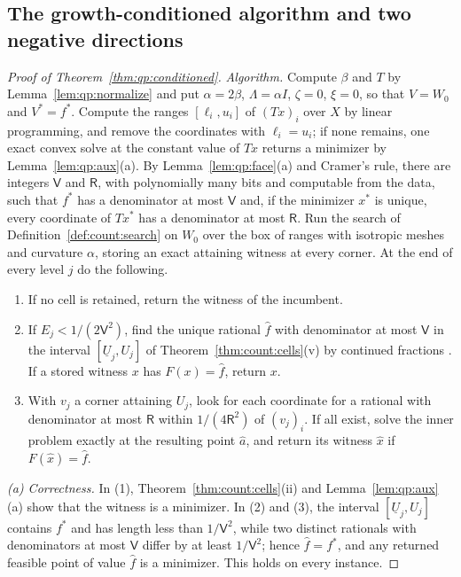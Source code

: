 \subsection{The growth-conditioned algorithm and two negative directions}

\begin{proof}[Proof of Theorem~\ref{thm:qp:conditioned}]
\emph{Algorithm.} Compute $\beta$ and $T$ by Lemma~\ref{lem:qp:normalize} and
put $\alpha=2\beta$, $\Lambda=\alpha I$, $\zeta=0$, $\xi=0$, so that
$V=W_0$ and $V^*=f^*$. Compute the ranges $[\ell_i,u_i]$ of $(Tx)_i$ over $X$
by linear programming, and remove the coordinates with $\ell_i=u_i$; if none
remains, one exact convex solve at the constant value of $Tx$ returns a
minimizer by Lemma~\ref{lem:qp:aux}(a). By Lemma~\ref{lem:qp:face}(a) and
Cramer's rule, there are integers $\mathsf V$ and $\mathsf R$, with
polynomially many bits and computable from the data, such that $f^*$ has a
denominator at most $\mathsf V$ and, if the minimizer $x^*$ is unique, every
coordinate of $Tx^*$ has a denominator at most $\mathsf R$. Run the search of
Definition~\ref{def:count:search} on $W_0$ over the box of ranges with
isotropic meshes and curvature $\alpha$, storing an exact attaining witness at
every corner. At the end of every level $j$ do the following.
\begin{enumerate}[label=(\arabic*)]
\item If no cell is retained, return the witness of the incumbent.
\item If $E_j<1/(2\mathsf V^2)$, find the unique rational $\hat f$ with
 denominator at most $\mathsf V$ in the interval $[\underline U_j,U_j]$ of
 Theorem~\ref{thm:count:cells}(v) by continued fractions
 \cite{grotschel1988-geometric-algorithms-and-combinatorial-optimization}. If a
 stored witness $x$ has $F(x)=\hat f$, return $x$.
\item With $v_j$ a corner attaining $U_j$, look for each coordinate for a
 rational with denominator at most $\mathsf R$ within $1/(4\mathsf R^2)$ of
 $(v_j)_i$. If all exist, solve the inner problem exactly at the resulting
 point $\hat a$, and return its witness $\hat x$ if $F(\hat x)=\hat f$.
\end{enumerate}

\emph{(a) Correctness.} In (1), Theorem~\ref{thm:count:cells}(ii) and
Lemma~\ref{lem:qp:aux}(a) show that the witness is a minimizer. In (2) and (3),
the interval $[\underline U_j,U_j]$ contains $f^*$ and has length less than
$1/\mathsf V^2$, while two distinct rationals with denominators at most
$\mathsf V$ differ by at least $1/\mathsf V^2$; hence $\hat f=f^*$, and any
returned feasible point of value $\hat f$ is a minimizer. This holds on every
instance.


\end{proof}
